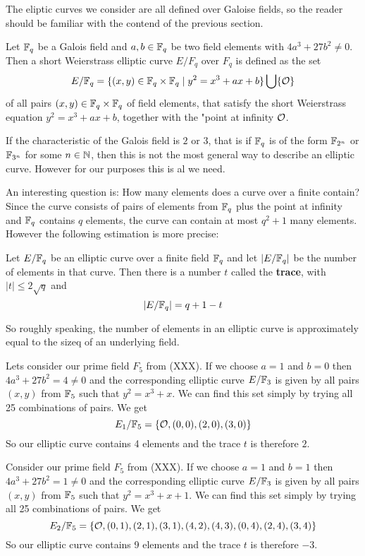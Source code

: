 The eliptic curves we consider are all defined over Galoise fields, so the reader should be familiar with the contend of the previous section.

\begin{definition} Let $\mathbb{F}_{q}$ be a Galois field and $a,b\in \mathbb{F}_q$ be two field elements with $ 4a^3+ 27b^2 \neq 0 $. Then a short Weierstrass elliptic curve $E/F_q$ over $F_q$ is defined as the set
$$
E/\mathbb{F}_q = \{(x,y)\in \mathbb{F}_q\times \mathbb{F}_q\;|\; y^2=x^3+ax+b \} \bigcup \{\mathcal{O}\}
$$
of all pairs $(x,y)\in \mathbb{F}_q\times \mathbb{F}_q$ of field elements, that satisfy the short Weierstrass equation $y^2=x^3+ax+b$, together with the "point at infinity $\mathcal{O}$.
\end{definition}
If the characteristic of the Galois field is $2$ or $3$, that is if $\mathbb{F}_q$ is of the form $\mathbb{F}_{2^n}$ or $\mathbb{F}_{3^n}$ for some $n\in\mathbb{N}$, then this is not the most general way to describe an elliptic curve. However for our purposes this is al we need.

An interesting question is: How many elements does a curve over a finite contain? Since the curve consists of pairs of elements from $\mathbb{F}_q$ plus the point at infinity and $\mathbb{F}_q$ contains $q$ elements, the curve can contain at most $q^2+1$ many elements. However the following estimation is more precise:
\begin{theorem} Let $E/\mathbb{F}_q$ be an elliptic curve over a finite field $\mathbb{F}_q$ and let $|E/\mathbb{F}_q|$ be the number of elements in that curve. Then there is a number $t$ called the \textbf{trace}, with $|t| \leq 2\sqrt{q}$ and
$$
|E/\mathbb{F}_q| = q +1 -t
$$
\end{theorem}
So roughly speaking, the number of elements in an elliptic curve is approximately equal to the sizeq of an underlying field.
\begin{example}Lets consider our prime field $F_5$ from (XXX). If we choose $a=1$ and $b=0$ then $4a^3+ 27b^2 = 4 \neq  0 $ and the corresponding elliptic curve $E/\mathbb{F}_{3}$ is given by all pairs $(x,y)$ from $\mathbb{F}_5$ such that $y^2=x^3+x$. We can find this set simply by trying all 25 combinations of pairs. We get
$$
E_1/\mathbb{F}_5 = \{\mathcal{O}, (0,0),(2,0),(3,0)\}
$$
So our elliptic curve contains 4 elements and the trace $t$ is therefore $2$. 
\end{example}
\begin{example}Consider our prime field $F_5$ from (XXX). If we choose $a=1$ and $b=1$ then $4a^3+ 27b^2 = 1 \neq  0 $ and the corresponding elliptic curve $E/\mathbb{F}_{3}$ is given by all pairs $(x,y)$ from $\mathbb{F}_5$ such that $y^2=x^3+x+1$. We can find this set simply by trying all 25 combinations of pairs. We get
$$
E_2/\mathbb{F}_5 = \{\mathcal{O}, (0,1),(2,1),(3,1),(4,2),(4,3),(0,4),(2,4),(3,4)\}
$$
So our elliptic curve contains 9 elements and the trace $t$ is therefore $-3$.
\end{example}


